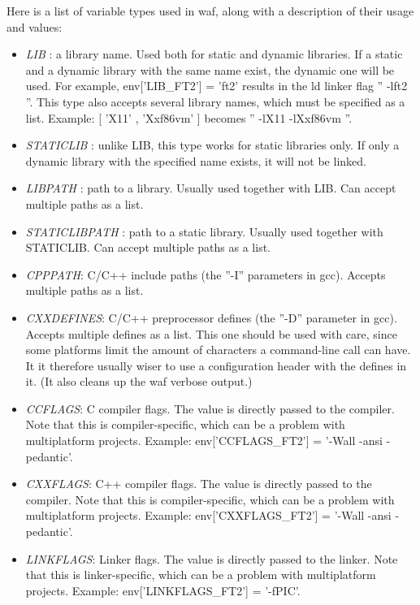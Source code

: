 \documentclass[a4paper,10pt]{article}
\begin{document}
Here is a list of variable types used in waf, along with a description of their usage and values:\\
\begin{itemize}
	\item \emph{LIB} : a library name. Used both for static and dynamic libraries. If a static and a dynamic library with the same name exist, the dynamic one will be used. For example, env['LIB\_FT2'] = 'ft2' results in the ld linker flag '' -lft2 ''. This type also accepts several library names, which must be specified as a list. Example: [ 'X11' , 'Xxf86vm' ] becomes '' -lX11 -lXxf86vm ''.
	\item \emph{STATICLIB} : unlike LIB, this type works for static libraries only. If only a dynamic library with the specified name exists, it will not be linked.
	\item \emph{LIBPATH} : path to a library. Usually used together with LIB. Can accept multiple paths as a list.
	\item \emph{STATICLIBPATH} : path to a static library. Usually used together with STATICLIB. Can accept multiple paths as a list.
	\item \emph{CPPPATH}: C/C++ include paths (the ''-I'' parameters in gcc). Accepts multiple paths as a list.
	\item \emph{CXXDEFINES}: C/C++ preprocessor defines (the ''-D'' parameter in gcc). Accepts multiple defines as a list. This one should be used with care, since some platforms limit the amount of characters a command-line call can have. It it therefore usually wiser to use a configuration header with the defines in it. (It also cleans up the waf verbose output.)
	\item \emph{CCFLAGS}: C compiler flags. The value is directly passed to the compiler. Note that this is compiler-specific, which can be a problem with multiplatform projects. Example: env['CCFLAGS\_FT2'] = '-Wall -ansi -pedantic'.
	\item \emph{CXXFLAGS}: C++ compiler flags. The value is directly passed to the compiler. Note that this is compiler-specific, which can be a problem with multiplatform projects. Example: env['CXXFLAGS\_FT2'] = '-Wall -ansi -pedantic'.
	\item \emph{LINKFLAGS}: Linker flags. The value is directly passed to the linker. Note that this is linker-specific, which can be a problem with multiplatform projects. Example: env['LINKFLAGS\_FT2'] = '-fPIC'.
\end{itemize}
\end{document}
